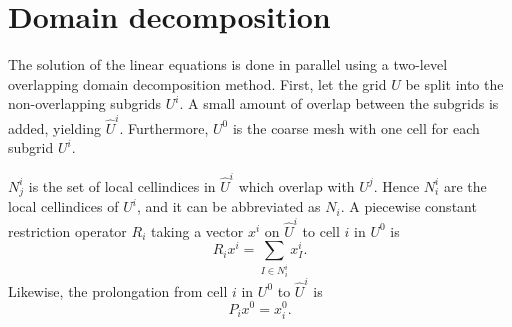 \chapter{Domain decomposition}

\minitoc

The solution of the linear equations is done in parallel using a
two-level overlapping domain decomposition method. First, let the grid
$U$ be split into the non-overlapping subgrids $U^i$. A small amount
of overlap between the subgrids is added, yielding $\hat U^i$.
Furthermore, $U^0$ is the coarse mesh with one cell for each subgrid
$U^i$.

$N_j^i$ is the set of local cellindices in $\hat U^i$ which overlap
with $U^j$. Hence $N_i^i$ are the local cellindices of $U^i$, and it
can be abbreviated as $N_i$. A piecewise constant restriction operator
$R_i$ taking a vector $x^i$ on $\hat U^i$ to cell $i$ in $U^0$ is
\begin{equation}
  R_i x^i = \sum_{I\in N_i^i} x_I^i.
\end{equation}
Likewise, the prolongation from cell $i$ in $U^0$ to $\hat U^i$ is
\begin{equation}
  P_i x^0 = x_i^0.
\end{equation}



